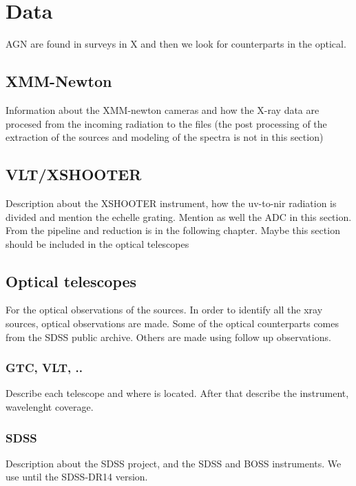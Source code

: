 
\chapter{Data} %
\label{chap:sample}

AGN are found in surveys in X and then we look for counterparts in the optical. 

\section{XMM-Newton}
\label{sec2:rrhs}

Information about the XMM-newton cameras and how the X-ray data are procesed from the incoming radiation to the files (the post processing of the extraction of the sources and modeling of the spectra is not in this section)

\section{VLT/XSHOOTER}
\label{sec2:xhs}

Description about the XSHOOTER instrument, how the uv-to-nir radiation is divided and mention the echelle grating. Mention as well the ADC in this section. From the pipeline and reduction is in the following chapter. Maybe this section should be included in the optical telescopes


\section{Optical telescopes}
\label{sec2:hsamples}

For the optical observations of the sources. In order to identify all the xray sources, optical observations are made. Some of the optical counterparts comes from the SDSS public archive. Others are made using follow up observations. 

\subsection{GTC, VLT, ..}
\label{sec2:xhs}

Describe each telescope and where is located. After that describe the instrument, wavelenght coverage.


\subsection{SDSS}
\label{sec2:mirhs}

Description about the SDSS project, and the SDSS and BOSS instruments. We use until the SDSS-DR14 version.
